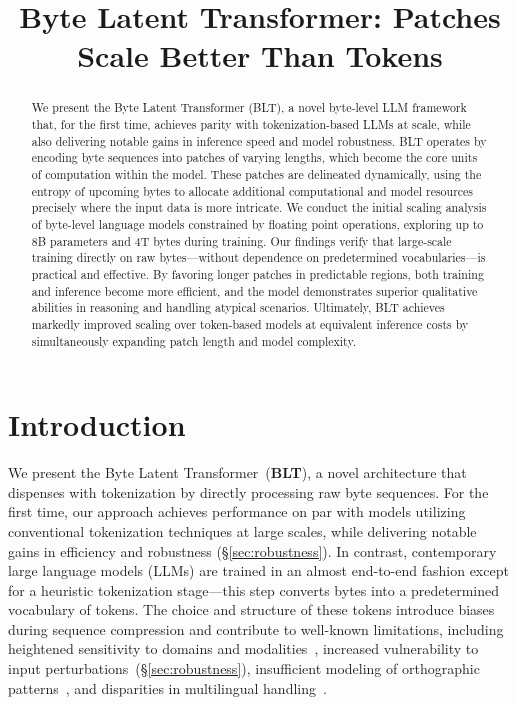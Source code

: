 \title{Byte Latent Transformer: Patches Scale Better Than Tokens}

\begin{abstract}
We present the Byte Latent Transformer ({\textsc BLT}), a novel byte-level LLM framework that, for the first time, achieves parity with tokenization-based LLMs at scale, while also delivering notable gains in inference speed and model robustness.
{\textsc BLT} operates by encoding byte sequences into patches of varying lengths, which become the core units of computation within the model. These patches are delineated dynamically, using the entropy of upcoming bytes to allocate additional computational and model resources precisely where the input data is more intricate. We conduct the initial scaling analysis of byte-level language models constrained by floating point operations, exploring up to 8B parameters and 4T bytes during training. Our findings verify that large-scale training directly on raw bytes—without dependence on predetermined vocabularies—is practical and effective. By favoring longer patches in predictable regions, both training and inference become more efficient, and the model demonstrates superior qualitative abilities in reasoning and handling atypical scenarios. Ultimately, {\textsc BLT} achieves markedly improved scaling over token-based models at equivalent inference costs by simultaneously expanding patch length and model complexity.
\end{abstract}

\section{Introduction}
\label{section:intro}

We present the Byte Latent Transformer~(\textbf{BLT}), a novel architecture that dispenses with tokenization by directly processing raw byte sequences. For the first time, our approach achieves performance on par with models utilizing conventional tokenization techniques at large scales, while delivering notable gains in efficiency and robustness (\S\ref{sec:robustness}). In contrast, contemporary large language models (LLMs) are trained in an almost end-to-end fashion except for a heuristic tokenization stage—this step converts bytes into a predetermined vocabulary of tokens. The choice and structure of these tokens introduce biases during sequence compression and contribute to well-known limitations, including heightened sensitivity to domains and modalities~\citep{dagangetting}, increased vulnerability to input perturbations~(\S\ref{sec:robustness}), insufficient modeling of orthographic patterns~\citep{edman2024cute}, and disparities in multilingual handling~\citep{liang2023xlm,petrov2024language,limisiewicz2024myte}.

